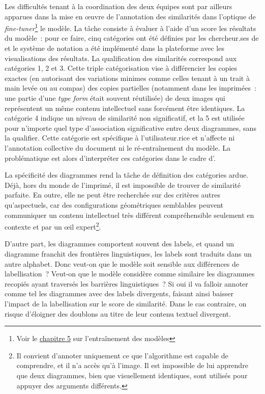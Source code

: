 Les difficultés tenant à la coordination des deux équipes sont par
ailleurs apparues dans la mise en œuvre de l'annotation des similarités dans l'optique de \emph{fine-tuner}\footnote{Voir le \hyperlink{fine-tuner-le-modele}{chapitre 5} sur l'entraînement des modèles} le modèle. La
tâche consiste à évaluer à l'aide d'un score les résultats du modèle~:
pour ce faire, cinq catégories ont été définies par les chercheur.ses de
\vhs et le système de notation a été implémenté dans la plateforme avec
les visualisations des résultats. La qualification des similarités
correspond aux catégories 1, 2 et 3. Cette triple catégorisation vise à
différencier les copies exactes (en autorisant des variations minimes
comme celles tenant à un trait à main levée ou au compas) des copies
partielles (notamment dans les imprimées~: une partie d'une \emph{type
form} était souvent réutilisée) de deux images qui représentent un même
contenu intellectuel sans forcément être identiques. La catégorie 4
indique un niveau de similarité non significatif, et la 5 est utilisée
pour n'importe quel type d'association significative entre deux
diagrammes, sans la qualifier. Cette catégorie est spécifique à
l'utilisateur.rice et n'affecte ni l'annotation collective du document ni le
ré-entraînement du modèle. La problématique est alors d'interpréter ces
catégories dans le cadre d'\eida.

La spécificité des diagrammes rend la tâche de définition des catégories
ardue. Déjà, hors du monde de l'imprimé, il est
impossible de trouver de similarité parfaite. En outre, elle ne peut
être recherchée sur des critères autres qu'aspectuels, car des
configurations géométriques semblables peuvent communiquer un contenu
intellectuel très différent compréhensible seulement en contexte et par
un œil expert\footnote{Il convient d'annoter uniquement ce que
  l'algorithme est capable de comprendre, et il n'a accès qu'à l'image.
  Il est impossible de lui apprendre que deux diagrammes, bien que
  visuellement identiques, sont utilisés pour appuyer des arguments
  différents.}.

D'autre part, les diagrammes comportent souvent des labels, et quand un
diagramme franchit des frontières linguistiques, les labels sont
traduits dans un autre alphabet. Donc veut-on que le modèle soit
sensible aux différences de labellisation~? Veut-on que le modèle
considère comme similaire les diagrammes recopiés ayant traversés les
barrières linguistiques~? Si oui il va falloir annoter comme tel les
diagrammes avec des labels divergents, faisant ainsi baisser l'impact de
la labellisation sur le score de similarité. Dans le cas contraire, on
risque d'éloigner des doublons au titre de leur contenu textuel
divergent.

